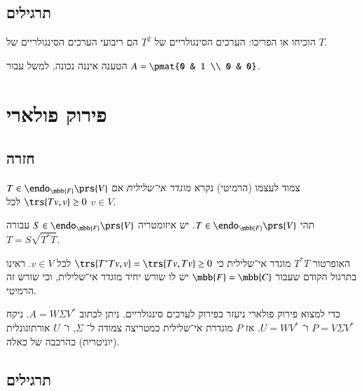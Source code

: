 \documentclass[a4paper,10pt,oneside,openany]{article}
\begin{document}
\subsection{תרגילים}

\begin{exercise}
הוכיחו או הפריכו: הערכים הסינגולריים של
$T^2$
הם ריבועי הערכים הסינגולריים של
$T$.
\end{exercise}

\begin{solution}
הטענה איננה נכונה, למשל עבור
$A = \pmat{0 & 1 \\ 0 & 0}$.
\end{solution}

\section{פירוק פולארי}

\subsection{חזרה}

\begin{definition}
$T \in \endo_{\mbb{F}}\prs{V}$
צמוד לעצמו (הרמיטי) נקרא
\emph{מוגדר אי־שלילית}
אם
$\trs{Tv, v} \geq 0$
לכל
$v \in V$.
\end{definition}

\begin{theorem}
תהי
$T \in \endo_{\mbb{F}}\prs{V}$.
יש איזומטריה
$S \in \endo_{\mbb{F}}\prs{V}$
עבורה
$T = S \sqrt{T^* T}$.
\end{theorem}

\begin{remark}
האופרטור
$T^* T$
מוגדר אי־שלילית כי
$\trs{T^* Tv, v} = \trs{Tv, Tv} \geq 0$
לכל
$v \in V$.
ראינו בתרגול הקודם שעבור
$\mbb{F} = \mbb{C}$
יש לו שורש יחיד מוגדר אי־שלילית, וכי שורש זה הרמיטי.
\end{remark}

\begin{algorithm}
כדי למצוא פירוק פולארי ניעזר בפירוק לערכים סינגולריים.
ניתן לכתוב
$A = W \Sigma V^*$.
ניקח
$P = V \Sigma V^*$
ו־%
$U = W V^*$.
אז
$P$
מוגדרת אי־שלילית כמטריצה צמודה ל־%
$\Sigma$,
ו־%
$U$
אורתוגונלית (יוניטרית) כהרכבה של כאלה.
\end{algorithm}

\subsection{תרגילים}
\end{document}
